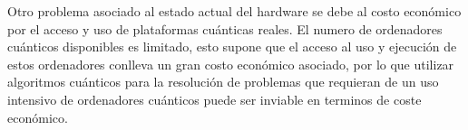  \newpage

 Otro problema asociado al estado actual del hardware se debe al costo económico por el acceso y uso de plataformas cuánticas reales. El numero de ordenadores cuánticos disponibles es limitado, esto supone que el acceso al uso y ejecución de estos ordenadores conlleva un gran costo económico asociado, por lo que utilizar algoritmos cuánticos para la resolución de problemas que requieran de un uso intensivo de ordenadores cuánticos puede ser inviable en terminos de coste económico. 






